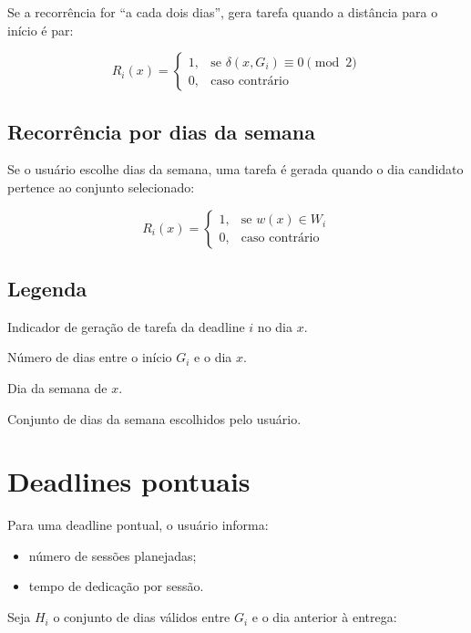 \documentclass[12pt,a4paper]{article}
\begin{document}
Se a recorrência for ``a cada dois dias'', gera tarefa quando a distância para o início é par:

\[
R_i(x) =
\begin{cases}
1, & \text{se } \delta(x, G_i) \equiv 0 \pmod{2} \\
0, & \text{caso contrário}
\end{cases}
\]

\subsection{Recorrência por dias da semana}

Se o usuário escolhe dias da semana, uma tarefa é gerada quando o dia candidato pertence ao conjunto selecionado:

\[
R_i(x) =
\begin{cases}
1, & \text{se } w(x) \in W_i \\
0, & \text{caso contrário}
\end{cases}
\]

\subsection*{Legenda}

\begin{description}[leftmargin=2.2cm]
    \item[$R_i(x)$] Indicador de geração de tarefa da deadline $i$ no dia $x$.
    \item[$\delta(x, G_i)$] Número de dias entre o início $G_i$ e o dia $x$.
    \item[$w(x)$] Dia da semana de $x$.
    \item[$W_i$] Conjunto de dias da semana escolhidos pelo usuário.
\end{description}

\section{Deadlines pontuais}

Para uma deadline pontual, o usuário informa:

\begin{itemize}
    \item número de sessões planejadas;
    \item tempo de dedicação por sessão.
\end{itemize}

Seja $H_i$ o conjunto de dias válidos entre $G_i$ e o dia anterior à entrega:
\end{document}
